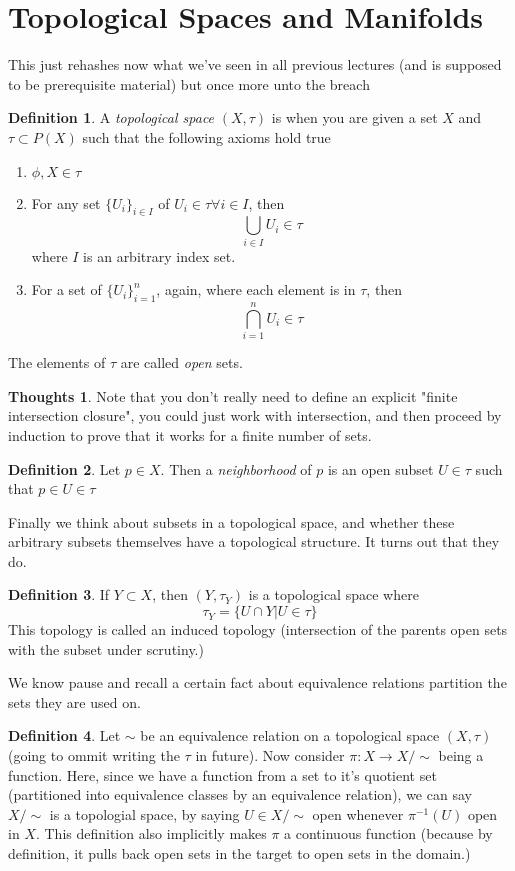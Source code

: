 \documentclass[12pt]{book}
\theoremstyle{definition}
\newtheorem*{definition}{Definition}
\newtheorem*{huh}{Thoughts}
\begin{document}
\section{Topological Spaces and Manifolds}
This just rehashes now what we've seen in all previous lectures (and is supposed to be prerequisite material) but once more unto the breach
\begin{definition}
    A \textit{topological space} $(X, \tau)$ is when you are given a set $X$ and $\tau \subset P(X)$ such that the following axioms hold true \begin{enumerate}
        \item $\phi, X \in \tau$
        \item For any set $\{U_i\}_{i \in I}$ of $U_i \in \tau \forall i \in I$, then $$ \bigcup_{i \in I} U_i \in \tau$$ where $I$ is an arbitrary index set. 
        \item For a set of $\{U_i\}_{i = 1}^n$, again, where each element is in $\tau$, then $$\bigcap_{i = 1}^n U_i \in \tau$$
    \end{enumerate}
    The elements of $\tau$ are called \textit{open} sets. 
    \begin{huh}Note that you don't really need to define an explicit "finite intersection closure", you could just work with intersection, and then proceed by induction to prove that it works for a finite number of sets.\end{huh}
\end{definition}
\begin{definition}
    Let $p \in X$. Then a \textit{neighborhood} of $p$ is an open subset $U \in \tau$ such that $p \in U \in \tau$
\end{definition}
Finally we think about subsets in a topological space, and whether these arbitrary subsets themselves have a topological structure. It turns out that they do.
\begin{definition}
    If $Y \subset X$, then $(Y, \tau_Y)$ is a topological space where $$\tau_Y = \{ U \cap Y | U \in \tau\}$$ This topology is called an induced topology (intersection of the parents open sets with the subset under scrutiny.)
\end{definition}
We know pause and recall a certain fact about equivalence relations partition the sets they are used on.
\begin{definition}
    Let $\sim$ be an equivalence relation on a topological space $(X, \tau)$ (going to ommit writing the $\tau$ in future). Now consider $\pi: X \to X/\sim$ being a function. Here, since we have a function from a set to it's quotient set (partitioned into equivalence classes by an equivalence relation), we can say $X/\sim$ is a topologial space, by saying $U \in X/\sim$ open whenever $\pi^{-1}(U)$ open in $X$. This definition also implicitly makes $\pi$ a continuous function (because by definition, it pulls back open sets in the target to open sets in the domain.)
\end{definition}
\end{document}
